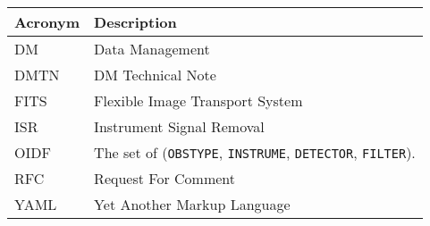 \addtocounter{table}{-1}
\begin{longtable}{p{}p{}}\hline
\textbf{Acronym} & \textbf{Description}  \\\hline

DM & Data Management \\\hline
DMTN & DM Technical Note \\\hline
FITS & Flexible Image Transport System \\\hline
ISR & Instrument Signal Removal \\\hline
OIDF & The set of (\verb|OBSTYPE|, \verb|INSTRUME|, \verb|DETECTOR|, \verb|FILTER|). \\\hline
RFC & Request For Comment \\\hline
YAML & Yet Another Markup Language \\\hline
\end{longtable}
